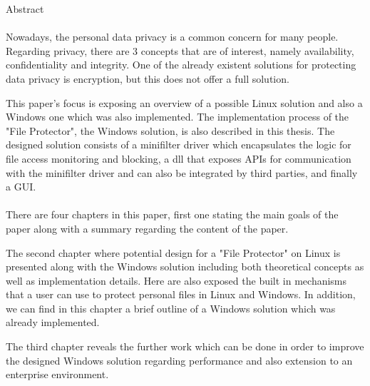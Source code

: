 \documentclass[a4paper]{article}
\begin{document}
    
    \Large
     \begin{center}
        Abstract\\ 
    
    \hspace{10pt}
   
    \end{center}
    
    \hspace{10pt}
    
    \normalsize
	
	\paragraph{}
	Nowadays, the personal data privacy is a common concern for many people. Regarding privacy, there are 3 concepts that are of interest, namely availability, confidentiality and integrity. One of the already existent solutions for protecting data privacy is encryption, but this does not offer a full solution.
		
	This paper's focus is exposing an overview of a possible Linux solution and also a Windows one which was also implemented. The implementation process of the "File Protector", the Windows solution, is also described in this thesis. The designed solution consists of a minifilter driver which encapsulates the logic for file access monitoring and blocking, a dll that exposes APIs for communication with the minifilter driver and can also be integrated by third parties, and finally a GUI.
	
	\paragraph{}
	There are four chapters in this paper, first one stating the main goals of the paper along with a summary regarding the content of the paper. 
	
	The second chapter where potential design for a "File Protector" on Linux is presented along with the Windows solution including both theoretical concepts as well as implementation details. Here are also exposed the built in mechanisms that a user can use to protect personal files in Linux and Windows. In addition, we can find in this chapter a brief outline of a Windows solution which was already implemented.
	
	The third chapter reveals the further work which can be done in order to improve the designed Windows solution regarding performance and also extension to an enterprise environment.
	
\end{document}
